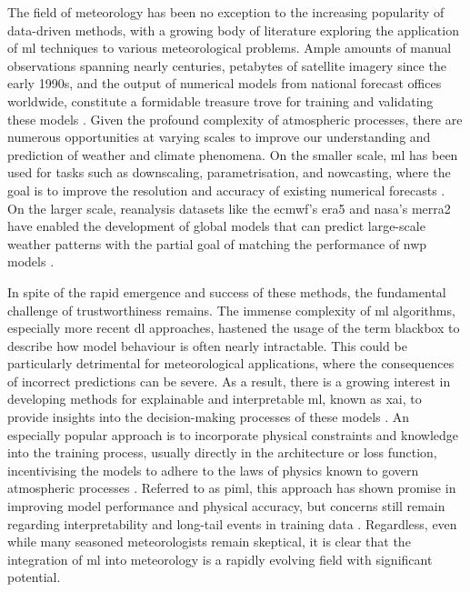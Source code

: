 The field of meteorology has been no exception to the increasing popularity of data-driven methods, with a growing body of literature exploring the application of \acrshort{ml} techniques to various meteorological problems. Ample amounts of manual observations spanning nearly centuries, petabytes of satellite imagery since the early 1990s, and the output of numerical models from national forecast offices worldwide, constitute a formidable treasure trove for training and validating these models \citep{Bracco2024,Waqas2024,Zhang2025}. Given the profound complexity of atmospheric processes, there are numerous opportunities at varying scales to improve our understanding and prediction of weather and climate phenomena. On the smaller scale, \acrshort{ml} has been used for tasks such as downscaling, parametrisation, and nowcasting, where the goal is to improve the resolution and accuracy of existing numerical forecasts \citep{Blunn2024,Zhang2023}. On the larger scale, reanalysis datasets like the \acrfull{ecmwf}'s \acrfull{era5} and \acrfull{nasa}'s \acrfull{merra2} have enabled the development of global models that can predict large-scale weather patterns with the partial goal of matching the performance of \acrfull{nwp} models \citep{Bracco2024,Gelaro2017,Hersbach2020,Zhang2025}.

In spite of the rapid emergence and success of these methods, the fundamental challenge of trustworthiness remains. The immense complexity of \acrshort{ml} algorithms, especially more recent \acrshort{dl} approaches, hastened the usage of the term \gls{blackbox} to describe how model behaviour is often nearly intractable. This could be particularly detrimental for meteorological applications, where the consequences of incorrect predictions can be severe. As a result, there is a growing interest in developing methods for explainable and interpretable \acrshort{ml}, known as \acrfull{xai}, to provide insights into the decision-making processes of these models \citep{Molnar2025}. An especially popular approach is to incorporate physical constraints and knowledge into the training process, usually directly in the architecture or loss function, incentivising the models to adhere to the laws of physics known to govern atmospheric processes \citep{Dabrowski2020,Chen2022,Luo2025,Zhang2023}. Referred to as \acrfull{piml}, this approach has shown promise in improving model performance and physical accuracy, but concerns still remain regarding interpretability and long-tail events in training data \citep{Lukacz2024,Radford2025,Sun2025}. Regardless, even while many seasoned meteorologists remain skeptical, it is clear that the integration of \acrshort{ml} into meteorology is a rapidly evolving field with significant potential.

